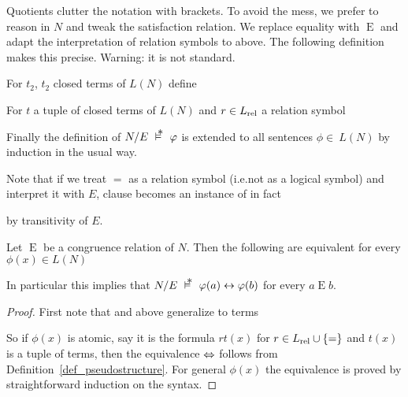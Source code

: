 \documentclass[creche.tex]{subfiles}
\begin{document}
\noindent\llap{\textcolor{red}{\Large\danger}\kern1.5ex}Quotients clutter the notation with brackets. To avoid the mess, we prefer to reason in $N$ and tweak the satisfaction relation.  We replace equality with $\mathrel{E}$ and adapt the interpretation of relation symbols to  above. The following definition makes this precise. Warning: it is not standard. 

\begin{definition}\label{def_pseudostructure}
For $t_2$, $t_2$ closed terms of $L(N)$ define


For $t$ a tuple of closed terms of $L(N)$ and $r\in L_{\rm rel}$ a relation symbol


Finally the definition of $N/E\ \pmodels\ \phi$ is extended to all sentences $\phi\in\ L(N)$ by induction in the usual way.\QED
\end{definition}

Note that if we treat $=$ as a relation symbol  (i.e.\@ not as a logical symbol) and interpret it with $E$, clause  becomes an instance of  in fact



by transitivity of $E$. 



\begin{proposition}\label{prop_pseudomodel}
Let $\mathrel{E}$ be a congruence relation of $N$. Then the following are equivalent for every $\phi(x)\in L(N)$


\end{proposition}

In particular this implies that $N/E\ \pmodels\ \phi(a)\iff\phi(b)$ for every $a\mathrel{E} b$.

\begin{proof}
First note that  and  above generalize to terms



So if $\phi(x)$ is atomic, say it is the formula $rt(x)$ for $r\in L_{\rm rel}\cup\{=\}$ and $t(x)$ is a tuple of terms, then the equivalence $\Leftrightarrow$ follows from Definition~\ref{def_pseudostructure}. For general $\phi(x)$ the equivalence is proved by straightforward induction on the syntax. 
\end{proof}
\end{document}
